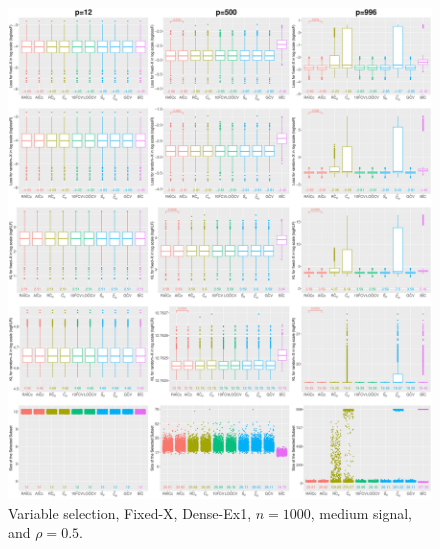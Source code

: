 \begin{figure}[!ht]
\centering
\includegraphics[width=\textwidth]{figures/supplement/fixedx/subset_selection/Dense-Ex1_n1000_msnr_rho05.eps}
\caption{Variable selection, Fixed-X, Dense-Ex1, $n=1000$, medium signal, and $\rho=0.5$.}
\end{figure}
\clearpage
